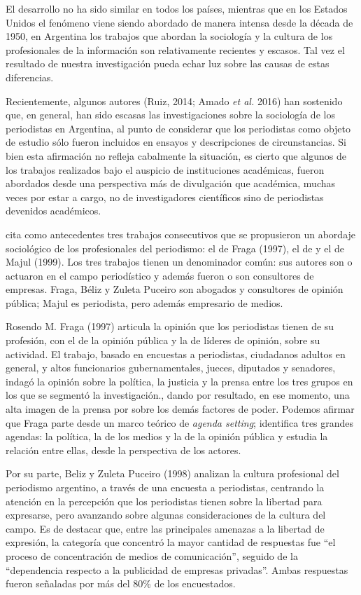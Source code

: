 El desarrollo no ha sido similar en todos los países, mientras que en los Estados Unidos el fenómeno viene siendo abordado de manera intensa desde la década de 1950, en Argentina los trabajos que abordan la sociología y la cultura de los profesionales de la información son relativamente recientes y escasos. Tal vez el resultado de nuestra investigación pueda echar luz sobre las causas de estas diferencias.

Recientemente, algunos autores (Ruiz, 2014; Amado \emph{et al.} 2016) han sostenido que, en general, han sido escasas las investigaciones sobre la sociología de los periodistas en Argentina, al punto de considerar que los periodistas como objeto de estudio sólo fueron incluidos en ensayos y descripciones de circunstancias. Si bien esta afirmación no refleja cabalmente la situación, es cierto que algunos de los trabajos realizados bajo el auspicio de instituciones académicas, fueron abordados desde una perspectiva más de divulgación que académica, muchas veces por estar a cargo, no de investigadores científicos sino de periodistas devenidos académicos.

\textcite{@6962-AMADO2016} cita como antecedentes tres trabajos consecutivos que se propusieron un abordaje sociológico de los profesionales del periodismo: el de Fraga (1997), el de \textcite{@6970-BELIZ1998} y el de Majul (1999). Los tres trabajos tienen un denominador común: sus autores son o actuaron en el campo periodístico y además fueron o son consultores de empresas. Fraga, Béliz y Zuleta Puceiro son abogados y consultores de opinión pública; Majul es periodista, pero además empresario de medios.

Rosendo M. Fraga (1997) articula la opinión que los periodistas tienen de su profesión, con el de la opinión pública y la de líderes de opinión, sobre su actividad. El trabajo, basado en encuestas a periodistas, ciudadanos adultos en general, y altos funcionarios gubernamentales, jueces, diputados y senadores, indagó la opinión sobre la política, la justicia y la prensa entre los tres grupos en los que se segmentó la investigación., dando por resultado, en ese momento, una alta imagen de la prensa por sobre los demás factores de poder. Podemos afirmar que Fraga parte desde un marco teórico de \emph{agenda setting}; identifica tres grandes agendas: la política, la de los medios y la de la opinión pública y estudia la relación entre ellas, desde la perspectiva de los actores.

Por su parte, Beliz y Zuleta Puceiro (1998) analizan la cultura profesional del periodismo argentino, a través de una encuesta a periodistas, centrando la atención en la percepción que los periodistas tienen sobre la libertad para expresarse, pero avanzando sobre algunas consideraciones de la cultura del campo. Es de destacar que, entre las principales amenazas a la libertad de expresión, la categoría que concentró la mayor cantidad de respuestas fue ``el proceso de concentración de medios de comunicación'', seguido de la ``dependencia respecto a la publicidad de empresas privadas''. Ambas respuestas fueron señaladas por más del 80\% de los encuestados.

